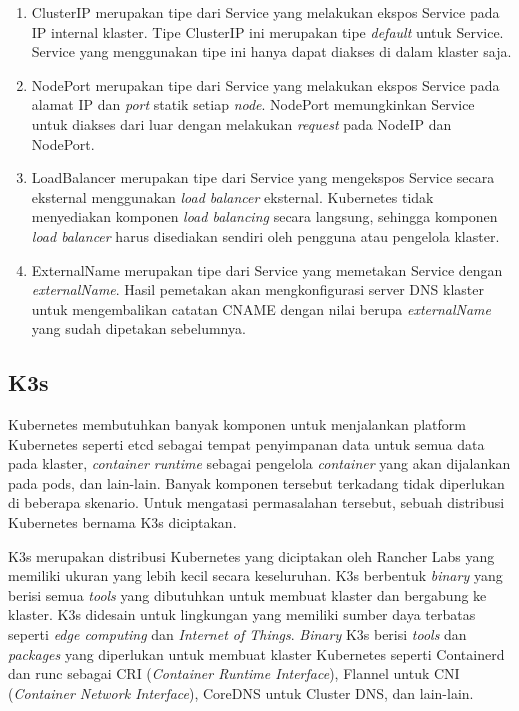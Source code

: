 \begin{enumerate}
  
  \item ClusterIP merupakan tipe dari Service yang melakukan ekspos Service
    pada IP internal klaster. Tipe ClusterIP ini merupakan tipe \emph{default}
    untuk Service. Service yang menggunakan tipe ini hanya dapat diakses di dalam
    klaster saja.

  \item NodePort merupakan tipe dari Service yang melakukan ekspos Service pada alamat IP
    dan \emph{port} statik setiap \emph{node}. NodePort memungkinkan Service untuk diakses dari luar
    dengan melakukan \emph{request} pada NodeIP dan NodePort.

  \item LoadBalancer merupakan tipe dari Service yang mengekspos Service secara eksternal
    menggunakan \emph{load balancer} eksternal. Kubernetes tidak menyediakan komponen
    \emph{load balancing} secara langsung, sehingga komponen \emph{load balancer} harus
    disediakan sendiri oleh pengguna atau pengelola klaster.

  \item ExternalName merupakan tipe dari Service yang memetakan Service dengan \emph{externalName}.
    Hasil pemetakan akan mengkonfigurasi server DNS klaster untuk mengembalikan catatan CNAME dengan
    nilai berupa \emph{externalName} yang sudah dipetakan sebelumnya.

\end{enumerate}

\subsection{K3s}
\label{chap:K3s}

Kubernetes membutuhkan banyak komponen untuk menjalankan platform Kubernetes
seperti etcd sebagai tempat penyimpanan data untuk semua data pada klaster,
\emph{container runtime} sebagai pengelola \emph{container} yang akan
dijalankan pada pods, dan lain-lain. Banyak komponen tersebut terkadang
tidak diperlukan di beberapa skenario. Untuk mengatasi permasalahan tersebut,
sebuah distribusi Kubernetes bernama K3s diciptakan.

K3s \parencite{k3s-website} merupakan distribusi Kubernetes yang diciptakan oleh Rancher Labs yang
memiliki ukuran yang lebih kecil secara keseluruhan. K3s berbentuk
\emph{binary} yang berisi semua \emph{tools} yang dibutuhkan untuk membuat
klaster dan bergabung ke klaster. K3s didesain untuk lingkungan
yang memiliki sumber daya terbatas seperti \emph{edge computing} dan \emph{Internet of Things}.
\emph{Binary} K3s berisi \emph{tools} dan \emph{packages} yang diperlukan untuk membuat
klaster Kubernetes seperti Containerd dan runc sebagai CRI (\emph{Container Runtime Interface}),
Flannel untuk CNI (\emph{Container Network Interface}), CoreDNS untuk Cluster DNS, dan lain-lain.

